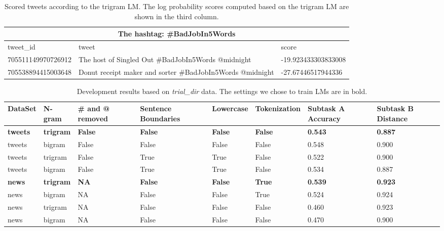 \documentclass[11pt,a4paper]{article}
\begin{document}
\begin{table*}[h!]
\centering
\begin{tabular}{ |p{4.7cm}|p{4.7cm}|p{4.7cm}| } 
\hline
\multicolumn{3}{|c|}{The hashtag: \#BadJobIn5Words} \\
\hline
tweet\_id & tweet & score \\
\hline 
705511149970726912 & The host of Singled Out \#BadJobIn5Words @midnight & -19.923433303833008 \\
\hline
705538894415003648 & Donut receipt maker and sorter  \#BadJobIn5Words @midnight & -27.67446517944336 \\
\hline
\end{tabular}
\caption{Scored tweets according to the trigram LM. The log probability scores computed based on the trigram LM are shown in the third column.}
\label{table:1}
\end{table*}

\begin{table*}[h!]
\centering
\begin{tabular}{ |p{1.2cm}|p{1.2cm}|p{1.2cm}|p{1.7cm}|p{1.5cm}|p{1.9cm}|p{1.7cm}|p{1.7cm}|}
\hline
DataSet & N-gram & \# and @ removed  & Sentence Boundaries & Lowercase & Tokenization & Subtask A Accuracy & Subtask B Distance \\
\hline
\textbf{tweets} & \textbf{trigram} & \textbf{False} & \textbf{False} & \textbf{False} & \textbf{False} & \textbf{0.543} & \textbf{0.887} \\
\hline
tweets & bigram & False & False & False & False & 0.548 & 0.900 \\ 
\hline
tweets & trigram & False & True & True & False & 0.522 & 0.900 \\
\hline
tweets & bigram & False & True & True & False & 0.534 & 0.887 \\
\hline
\textbf{news} & \textbf{trigram} & \textbf{NA} & \textbf{False} & \textbf{False} & \textbf{True} & \textbf{0.539} & \textbf{0.923} \\
\hline
news & bigram & NA & False & False & True & 0.524 & 0.924 \\
\hline
news & trigram & NA & False & False & False & 0.460 & 0.923 \\
\hline
news & bigram & NA & False & False & False & 0.470 & 0.900 \\
\hline
\end{tabular}
\caption{Development results based on \textit{trial\_dir} data. The settings we chose to train LMs are in bold.}
\label{table:2}
\end{table*}
\end{document}
